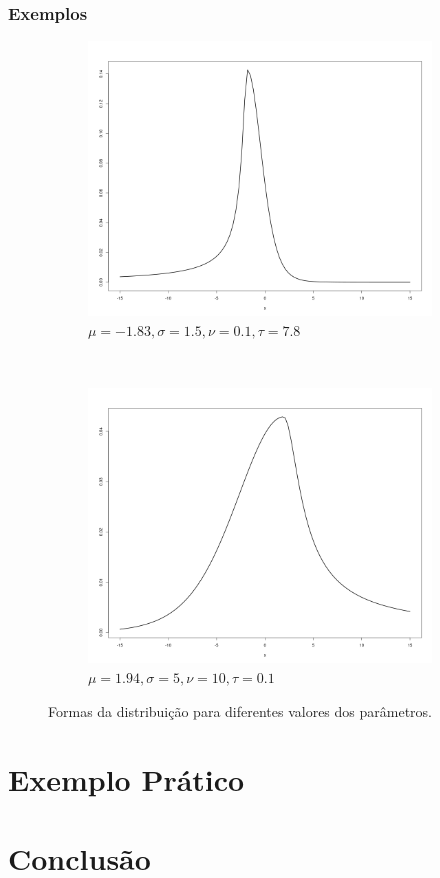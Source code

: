\documentclass[13pt, aspectratio=169]{beamer}
\begin{document}
\begin{frame}
    \frametitle{Exemplos}

    \begin{figure}[!ht]
        \centering
        \begin{subfigure}[t]{0.4\textwidth}
            \centering
            \includegraphics[width=\textwidth]{images/dist_1.png}
            \caption{$\mu = -1.83, \sigma = 1.5, \nu = 0.1, \tau = 7.8$}
        \end{subfigure}%
        ~
        \begin{subfigure}[t]{0.4\textwidth}
            \centering
            \includegraphics[width=\textwidth]{images/dist_2.png}
            \caption{$\mu = 1.94, \sigma = 5, \nu = 10, \tau = 0.1$}
        \end{subfigure}%
        \caption{Formas da distribuição para diferentes valores dos parâmetros.}
    \end{figure}
\end{frame}

\section{Exemplo Prático}

\section{Conclusão}
\end{document}
